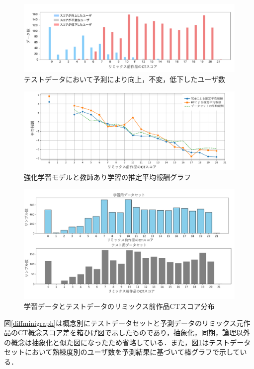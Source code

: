 \documentclass[submit,techrep,noauthor]{ipsj}
\begin{document}
\begin{figure}[h]
  \centering
  \includegraphics[width=\linewidth]{@IPSJ_SIGSE202511_Horio/fig/diffdata.pdf}
  \caption{テストデータにおいて予測により向上，不変，低下したユーザ数}
  \label{diffdata}
\end{figure}

\begin{figure}[h]
  \centering
  \includegraphics[width=\linewidth]{@IPSJ_SIGSE202511_Horio/fig/estgraph.pdf}
  \caption{強化学習モデルと教師あり学習の推定平均報酬グラフ}
  \label{estgraph}
\end{figure}
\begin{figure}[h]
  \centering
  \includegraphics[width=\linewidth]{@IPSJ_SIGSE202511_Horio/fig/train_testdata.pdf}
  \caption{学習データとテストデータのリミックス前作品CTスコア分布}
  \label{train_testdata}
\end{figure}

図\ref{diffminigraph}は概念別にテストデータセットと予測データのリミックス元作品のCT概念スコア差を箱ひげ図で示したものであり，抽象化，同期，論理以外の概念は抽象化と似た図になったため省略している．また，図\ref{diffdata}はテストデータセットにおいて熟練度別のユーザ数を予測結果に基づいて棒グラフで示している．
\end{document}
